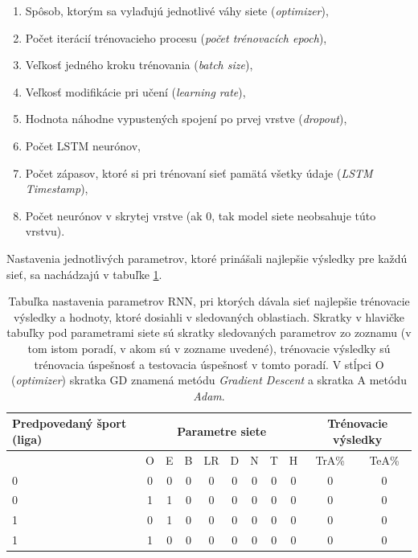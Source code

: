 \begin{enumerate}
  \item Spôsob, ktorým sa vylaďujú jednotlivé váhy siete (\textit{optimizer}),
  \item Počet iterácií trénovacieho procesu (\textit{počet trénovacích epoch}),
  \item Veľkosť jedného kroku trénovania (\textit{batch size}),
  \item Veľkosť modifikácie pri učení (\textit{learning rate}),
  \item Hodnota náhodne vypustených spojení po prvej vrstve (\textit{dropout}),
  \item Počet LSTM neurónov,
  \item Počet zápasov, ktoré si pri trénovaní sieť pamätá všetky údaje (\textit{LSTM Timestamp}),
  \item Počet neurónov v skrytej vrstve (ak 0, tak model siete neobsahuje túto vrstvu).
\end{enumerate}

Nastavenia jednotlivých parametrov, ktoré prinášali najlepšie výsledky pre každú sieť, sa nachádzajú v tabuľke \ref{rnn_train_res}.

\begin{table}[h!]
\begin{center}
\begin{tabular}{ p{7em}|c|c|c|c|c|c|c|c|c|c| } 
 Predpovedaný šport (liga) & \multicolumn{8}{|c|}{Parametre siete} & \multicolumn{2}{|p{5em}|}{Trénovacie výsledky}  \\ 
 \hline
  & O & E & B & LR & D & N & T & H & TrA\% & TeA\% \\
 \hline \hline
 0 & 0 & 0 & 0 & 0 & 0 & 0 & 0 & 0 & 0 & 0  \\ 
 0 & 1 & 1 & 0 & 0 & 0 & 0 & 0 & 0 & 0 & 0  \\ 
 1 & 0 & 1 & 0 & 0 & 0 & 0 & 0 & 0 & 0 & 0  \\ 
 1 & 1 & 0 & 0 & 0 & 0 & 0 & 0 & 0 & 0 & 0  \\ 
 \hline
\end{tabular}
\caption{Tabuľka nastavenia parametrov RNN, pri ktorých dávala sieť najlepšie trénovacie výsledky a hodnoty, ktoré dosiahli v sledovaných oblastiach. Skratky v hlavičke tabuľky pod parametrami siete sú skratky sledovaných parametrov zo zoznamu (v tom istom poradí, v akom sú v zozname uvedené), trénovacie výsledky sú trénovacia úspešnosť a testovacia úspešnosť v tomto poradí. V stĺpci O (\textit{optimizer}) skratka GD znamená metódu \textit{Gradient Descent} a skratka A metódu \textit{Adam}.}
\label{rnn_train_res}
\end{center}
\end{table}